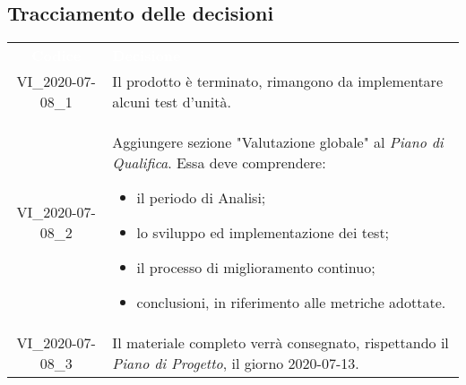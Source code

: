\pagebreak

\subsection{Tracciamento delle decisioni}
\begin{longtable}{ c L{12cm} }
\textcolor{white}{\textbf{Codice}} & \centerline{\textcolor{white}{\textbf{Decisione}}}\\	
		VI\_2020-07-08\_1 & Il prodotto è terminato, rimangono da implementare alcuni test d'unità.\\
		VI\_2020-07-08\_2 & Aggiungere sezione "Valutazione globale" al \textit{Piano di Qualifica}. Essa deve comprendere: \begin{itemize}
		\item il periodo di Analisi;
		\item lo sviluppo ed implementazione dei test;
		\item il processo di miglioramento continuo;
		\item conclusioni, in riferimento alle metriche adottate.
\end{itemize}		\\
		VI\_2020-07-08\_3 & Il materiale completo verrà consegnato, rispettando il \textit{Piano di Progetto}, il giorno 2020-07-13. \\
\end{longtable}